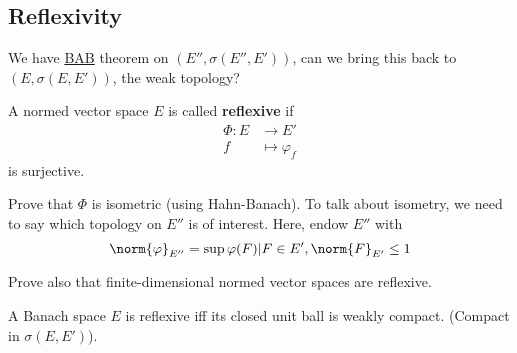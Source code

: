 \documentclass[twoside]{article}
\begin{document}
\subsection{Reflexivity}
\begin{aim}
    We have \hyperlink{thm:bab}{BAB} theorem on $(E'', \sigma(E'', E'))$, can we bring this back to $(E, \sigma(E, E'))$, the weak topology?
\end{aim}
\begin{defi}
    A normed vector space $E$ is called \textbf{reflexive} if
    \begin{align*}
        \Phi: E &\longrightarrow E' \\
        f &\longmapsto \varphi_f
    \end{align*}
    is surjective.
\end{defi}
\begin{ex}
    Prove that $\Phi$ is isometric (using Hahn-Banach).
    To talk about isometry, we need to say which topology on $E''$ is of interest.
    Here, endow $E''$ with
    \begin{equation*}
        \norm{\varphi}_{E''} = \sup{\varphi(F) | F \in E', \norm{F}_{E'} \leq 1}
    \end{equation*}

    Prove also that finite-dimensional normed vector spaces are reflexive.
\end{ex}
\begin{thm}[Kakutani]
    A Banach space $E$ is reflexive iff its closed unit ball is weakly compact. (Compact in $\sigma(E, E')$).
\end{thm}
\end{document}
